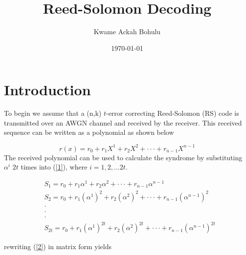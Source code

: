\documentclass[fontsize=12pt]{article}
\title{Reed-Solomon Decoding}
\author{Kwame Ackah Bohulu}
\date{\today}
\begin{document}
\maketitle

\newpage
\section{Introduction}
To begin we assume that a (n,k) $t$-error correcting Reed-Solomon (RS) code is transmitted
 over an AWGN 
channel and received by the receiver. This received sequence can be written as a polynomial
as shown below

\begin{equation}
r(x)=r_0+r_1X^1+r_2X^2+\cdot\cdot\cdot+r_{n-1}X^{n-1}
\label{1}
\end{equation}
The received polynomial can be used to calculate the syndrome by substituting $\alpha^i$
$2t$ times into (\ref{1}), where $i=1,2,...2t$.

\begin{equation}
\begin{split}
&S_1=r_0+r_1\alpha^1+r_2\alpha^2+\cdot\cdot\cdot+r_{n-1}\alpha^{n-1}\\
&S_2=r_0+r_1(\alpha^1)^2+r_2(\alpha^2)^2+\cdot\cdot\cdot+r_{n-1}(\alpha^{n-1})^2\\
&\cdot\\
  &\cdot\\
   &\cdot\\
&S_{2t}=r_0+r_1(\alpha^1)^{2t}+r_2(\alpha^2)^{2t}+\cdot\cdot\cdot+r_{n-1}(\alpha^{n-1})^{2t}
\end{split}
\label{2}
\end{equation}

rewriting (\ref{2}) in matrix form yields
\end{document}
